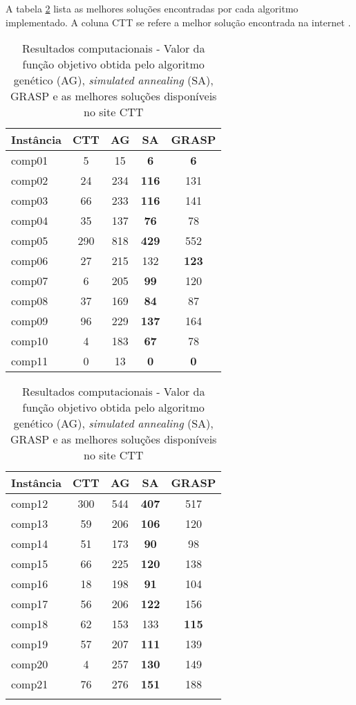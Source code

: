 \documentclass[11pt]{article}
\begin{document}
A tabela \ref{tabResultados} lista as melhores soluções encontradas por cada algoritmo implementado. A coluna CTT se refere a melhor solução encontrada na internet \cite{ctt}.

\begin{center}
\begin{table}[htbf]
\begin{tabular}{|l|c|c|c|c|}
\hline
Instância & CTT & AG & SA & GRASP \\ \hline
comp01 & 5 & 15 & \textbf{6} & \textbf{6} \\
comp02 & 24 & 234 & \textbf{116} & 131 \\
comp03 & 66 & 233 & \textbf{116} & 141 \\
comp04 & 35 & 137 & \textbf{76} & 78 \\
comp05 & 290 & 818 & \textbf{429} & 552 \\
comp06 & 27 & 215 & 132 & \textbf{123} \\
comp07 & 6 & 205 & \textbf{99} & 120 \\
comp08 & 37 & 169 & \textbf{84} & 87 \\
comp09 & 96 & 229 & \textbf{137} & 164 \\
comp10 & 4 & 183 & \textbf{67} & 78 \\
comp11 & 0 & 13 & \textbf{0} & \textbf{0} \\ \hline
\end{tabular}
\medskip
\begin{tabular}{|l|c|c|c|c|}
\hline
Instância & CTT & AG & SA & GRASP \\ \hline
comp12 & 300 & 544 & \textbf{407} & 517 \\
comp13 & 59 & 206 & \textbf{106} & 120 \\
comp14 & 51 & 173 & \textbf{90} & 98 \\
comp15 & 66 & 225 & \textbf{120} & 138 \\
comp16 & 18 & 198 & \textbf{91} & 104 \\
comp17 & 56 & 206 & \textbf{122} & 156 \\
comp18 & 62 & 153 & 133 & \textbf{115} \\
comp19 & 57 & 207 & \textbf{111} & 139 \\
comp20 & 4 & 257 & \textbf{130} & 149 \\
comp21 & 76 & 276 & \textbf{151} & 188 \\
 &  &  &  &   \\ \hline
\end{tabular}
\caption{Resultados computacionais - Valor da função objetivo obtida pelo algoritmo genético (AG), \textit{simulated annealing} (SA), GRASP e as melhores soluções disponíveis no site CTT}
\label{tabResultados}
\end{table}
\end{center}
\end{document}
